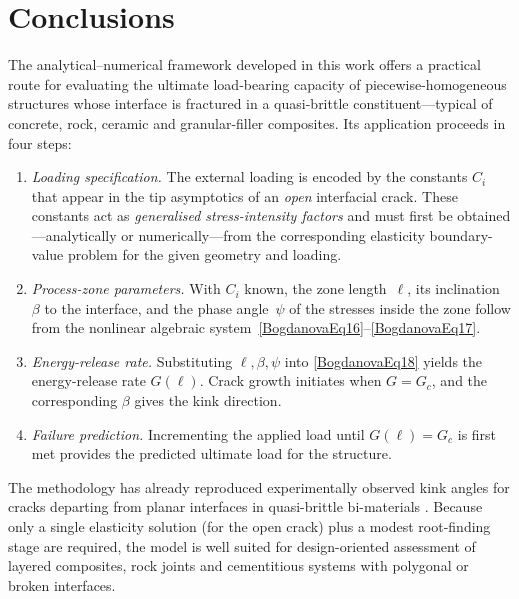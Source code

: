 \section{Conclusions}

The analytical–numerical framework developed in this work offers a practical route for evaluating the ultimate load‐bearing capacity of piecewise-homogeneous structures whose interface is fractured in a quasi-brittle constituent—typical of concrete, rock, ceramic and granular-filler composites.  
Its application proceeds in four steps:

\begin{enumerate}
	\item \emph{Loading specification.}  
	The external loading is encoded by the constants \(C_i\) that appear in the tip asymptotics of an \emph{open} interfacial crack.  
	These constants act as \emph{generalised stress-intensity factors} and must first be obtained—analytically or numerically—from the corresponding elasticity boundary-value problem for the given geometry and loading.
	
	\item \emph{Process-zone parameters.}  
	With \(C_i\) known, the zone length~\(\ell\), its inclination~\(\beta\) to the interface, and the phase angle~\(\psi\) of the stresses inside the zone follow from the nonlinear algebraic system~\eqref{BogdanovaEq16}–\eqref{BogdanovaEq17}.
	
	\item \emph{Energy-release rate.}  
	Substituting \(\ell,\beta,\psi\) into \eqref{BogdanovaEq18} yields the energy-release rate \(G(\ell)\).  
	Crack growth initiates when \(G = G_c\), and the corresponding \(\beta\) gives the kink direction.
	
	\item \emph{Failure prediction.}  
	Incrementing the applied load until \(G(\ell)=G_c\) is first met provides the predicted ultimate load for the structure.
\end{enumerate}

The methodology has already reproduced experimentally observed kink angles for cracks departing from planar interfaces in quasi-brittle bi-materials \cite{Bogdanova26}.  
Because only a single elasticity solution (for the open crack) plus a modest root-finding stage are required, the model is well suited for design-oriented assessment of layered composites, rock joints and cementitious systems with polygonal or broken interfaces.

\appendix                
\setcounter{section}{0}
\renewcommand\thesection{\thechapter.\Alph{section}}

